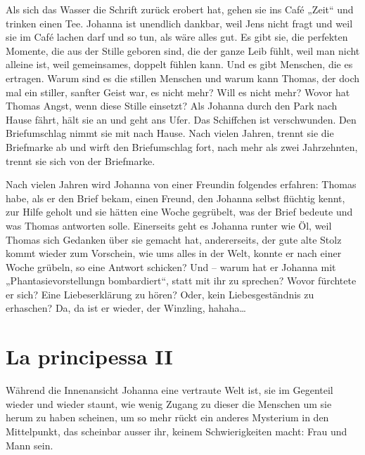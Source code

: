 \documentclass[10pt,titlepage,a5paper]{book}
\begin{document}
Als sich das Wasser die Schrift zurück erobert hat, gehen sie ins Café „Zeit“ und trinken einen Tee. Johanna ist unendlich dankbar, weil Jens nicht fragt und weil sie im Café lachen darf und so tun, als wäre alles gut. Es gibt sie, die perfekten Momente, die aus der Stille geboren sind, die der ganze Leib fühlt, weil man nicht alleine ist, weil gemeinsames, doppelt fühlen kann. Und es gibt Menschen, die es ertragen. Warum sind es die stillen Menschen und warum kann Thomas, der doch mal ein stiller, sanfter Geist war, es nicht mehr? Will es nicht mehr? Wovor hat Thomas Angst, wenn diese Stille einsetzt? Als Johanna durch den Park nach Hause fährt, hält sie an und geht ans Ufer. Das Schiffchen ist verschwunden. Den Briefumschlag nimmt sie mit nach Hause. Nach vielen Jahren, trennt sie die Briefmarke ab und wirft den Briefumschlag fort, nach mehr als zwei Jahrzehnten, trennt sie sich von der Briefmarke.

Nach vielen Jahren wird Johanna von einer Freundin folgendes erfahren: Thomas habe, als er den Brief bekam, einen Freund, den Johanna selbst flüchtig kennt, zur Hilfe geholt und sie hätten eine Woche gegrübelt, was der Brief bedeute und was Thomas antworten solle. Einerseits geht es Johanna runter wie Öl, weil Thomas sich Gedanken über sie gemacht hat, andererseits, der gute alte Stolz kommt wieder zum Vorschein, wie ums alles in der Welt, konnte er nach einer Woche grübeln, so eine Antwort schicken? Und – warum hat er Johanna mit „Phantasievorstellungn bombardiert“, statt mit ihr zu sprechen? Wovor fürchtete er sich? Eine Liebeserklärung zu hören? Oder, kein Liebesgeständnis zu erhaschen? Da, da ist er wieder, der Winzling, hahaha\dots 



\section*{La principessa II}




Während die Innenansicht Johanna eine vertraute Welt ist, sie im Gegenteil wieder und wieder staunt, wie wenig Zugang zu dieser die Menschen um sie herum zu haben scheinen, um so mehr rückt ein anderes Mysterium in den Mittelpunkt, das scheinbar ausser ihr, keinem Schwierigkeiten macht: Frau und Mann sein.
\end{document}
